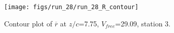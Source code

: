 \begin{figure}[H]
\centering
\texttt{[image: figs/run\_28/run\_28\_R\_contour]}
\caption{Contour plot of $\overline{r}$ at $z/c$=7.75, $V_{free}$=29.09, station 3.}
\label{fig:run_28_R_contour}
\end{figure}


